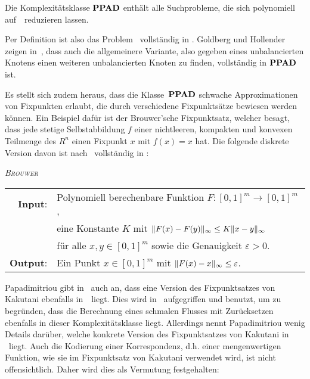 \begin{definition}
	Die Komplexitätsklasse $\textbf{PPAD}$ enthält alle Suchprobleme, die sich polynomiell auf~\EndOfTheLine\ reduzieren lassen.
\end{definition}

Per Definition ist also das Problem \EndOfTheLine~vollständig in \PPAD.
Goldberg und Hollender zeigen in~\cite[Theorem 15]{hairyball}, dass auch die allgemeinere Variante, also gegeben eines unbalancierten Knotens einen weiteren unbalancierten Knoten zu finden, vollständig in $\textbf{PPAD}$ ist.

Es stellt sich zudem heraus, dass die Klasse~$\textbf{PPAD}$ schwache Approximationen von Fixpunkten erlaubt, die durch verschiedene Fixpunktsätze bewiesen werden können.
Ein Beispiel dafür ist der Brouwer'sche Fixpunktsatz, welcher besagt, dass jede stetige Selbstabbildung $f$ einer nichtleeren, kompakten und konvexen Teilmenge des $R^n$ einen Fixpunkt $x$ mit $f(x) = x$ hat.
Die folgende diskrete Version davon ist nach~\cite{DASKALAKIS2019} vollständig in \PPAD:

\newcommand{\Brouwer}{\textsc{Brouwer}}

\begin{center}
	\begin{mdframed}
		\centering
		\emph{\Brouwer} \\[1em]
		\begin{tabular}{rl}
			{\bfseries Input}: &Polynomiell berechenbare Funktion $F: [0,1]^m \rightarrow [0, 1]^m$,\\
			& eine Konstante $K$ mit $\lVert F(x) - F(y)\rVert_\infty \leq K \lVert x - y\rVert_\infty$\\
			&für alle $x,y\in[0,1]^m$ sowie die Genauigkeit $\varepsilon>0$.\\
			{\bfseries Output}: & Ein Punkt $x\in[0,1]^m$ mit $\lVert F(x) - x\rVert_\infty \leq \varepsilon$.
		\end{tabular}
	\end{mdframed}
\end{center}

Papadimitriou gibt in~\cite{PPAD1994} auch an, dass eine Version des Fixpunktsatzes von Kakutani ebenfalls in~\PPAD\ liegt.
Dies wird in~\cite{Cominetti2015} aufgegriffen und benutzt, um zu begründen, dass die Berechnung eines schmalen Flusses mit Zurücksetzen ebenfalls in dieser Komplexitätsklasse liegt.
Allerdings nennt Papadimitriou wenig Details darüber, welche konkrete Version des Fixpunktsatzes von Kakutani in \PPAD\ liegt.
Auch die Kodierung einer Korrespondenz, d.h. einer mengenwertigen Funktion, wie sie im Fixpunktsatz von Kakutani verwendet wird, ist nicht offensichtlich.
Daher wird dies als Vermutung festgehalten:

